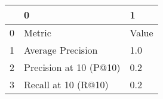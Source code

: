 \begin{tabular}{lll}
\toprule
{} &                       0 &      1 \\
\midrule
0 &                  Metric &  Value \\
1 &       Average Precision &    1.0 \\
2 &  Precision at 10 (P@10) &    0.2 \\
3 &     Recall at 10 (R@10) &    0.2 \\
\bottomrule
\end{tabular}
